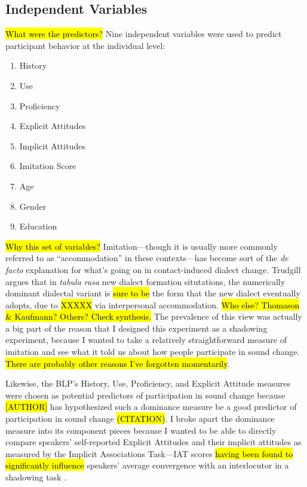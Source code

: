 \subsection{Independent Variables}
\hl{What were the predictors?} Nine independent variables were used to predict participant behavior at the individual level:

\begin{enumerate}
    \item History
    \item Use
    \item Proficiency
    \item Explicit Attitudes
    \item Implicit Attitudes
    \item Imitation Score
    \item Age
    \item Gender
    \item Education
\end{enumerate}

 \hl{Why this set of variables?}
Imitation---though it is usually more commonly referred to as ``accommodation'' in these contexts---has become sort of the \textit{de facto} explanation for what's going on in contact-induced dialect change. Trudgill \citeyear{trudgill1986dialects,trudgill2008colonial,trudgill2008on} argues that in \textit{tabula rasa} new dialect formation situtations, the numerically dominant dialectal variant is \hl{sure to be} the form that the new dialect eventually adopts, due to \hl{XXXXX} via interpersonal accommodation. \hl{Who else? Thomason \& Kaufmann? Others? Check synthesis.} The prevalence of this view was actually a big part of the reason that I designed this experiment as a shadowing experiment, because I wanted to take a relatively straightforward measure of imitation and see what it told us about how people participate in sound change. \hl{There are probably other reasons I've forgotten momentarily}.

Likewise, the BLP's History, Use, Proficiency, and Explicit Attitude measures were chosen as potential predictors of participation in sound change because \hl{[AUTHOR]} has hypothesized such a dominance measure be a good predictor of participation in sound change \hl{(CITATION)}. I broke apart the dominance measure into its component pieces because I wanted to be able to directly compare speakers' self-reported Explicit Attitudes and their implicit attitudes as measured by the Implicit Associations Task---IAT scores \hl{having been found to significantly influence} speakers' average convergence with an interlocutor in a shadowing task \citep{babel2010dialect}.

